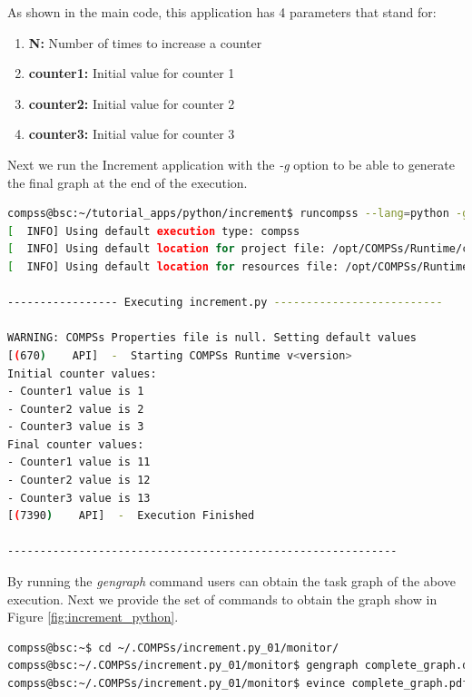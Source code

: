 As shown in the main code, this application has 4 parameters that stand for:

\begin{enumerate}
 \item \textbf{N:} Number of times to increase a counter
 \item \textbf{counter1:} Initial value for counter 1
 \item \textbf{counter2:} Initial value for counter 2
 \item \textbf{counter3:} Initial value for counter 3
\end{enumerate}

Next we run the Increment application with the \textit{-g} option to be able to generate the final graph at the end of the execution.

\begin{lstlisting}[language=bash]
compss@bsc:~/tutorial_apps/python/increment$ runcompss --lang=python -g ~/tutorial_apps/python/increment/increment.py 10 1 2 3
[  INFO] Using default execution type: compss
[  INFO] Using default location for project file: /opt/COMPSs/Runtime/configuration/xml/projects/default_project.xml
[  INFO] Using default location for resources file: /opt/COMPSs/Runtime/configuration/xml/resources/default_resources.xml

----------------- Executing increment.py --------------------------

WARNING: COMPSs Properties file is null. Setting default values
[(670)    API]  -  Starting COMPSs Runtime v<version>
Initial counter values:
- Counter1 value is 1
- Counter2 value is 2
- Counter3 value is 3
Final counter values:
- Counter1 value is 11
- Counter2 value is 12
- Counter3 value is 13
[(7390)    API]  -  Execution Finished

------------------------------------------------------------
\end{lstlisting}

By running the \textit{gengraph} command users can obtain the task graph of the above execution. Next we provide the set of commands
to obtain the graph show in Figure \ref{fig:increment_python}.

\begin{lstlisting}[language=bash]
compss@bsc:~$ cd ~/.COMPSs/increment.py_01/monitor/
compss@bsc:~/.COMPSs/increment.py_01/monitor$ gengraph complete_graph.dot
compss@bsc:~/.COMPSs/increment.py_01/monitor$ evince complete_graph.pdf
\end{lstlisting}

